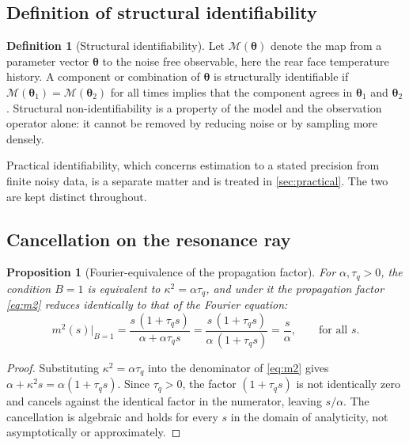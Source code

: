 \documentclass[preprint,12pt,a4paper]{elsarticle}
\theoremstyle{plain}
\newtheorem{proposition}{Proposition}
\theoremstyle{definition}
\newtheorem{definition}{Definition}
\theoremstyle{remark}
\newcommand{\tq}{\tau_{q}}
\newcommand{\kk}{\kappa^{2}}
\newcommand{\Bnum}{B}
\begin{document}
\subsection{Definition of structural identifiability}
\label{sec:struct-defs}

\begin{definition}[Structural identifiability]
\label{def:struct}
Let $\mathcal{M}(\bm{\theta})$ denote the map from a parameter vector
$\bm{\theta}$ to the noise free observable, here the rear face temperature
history. A component or combination of $\bm{\theta}$ is structurally
identifiable if $\mathcal{M}(\bm{\theta}_{1}) = \mathcal{M}(\bm{\theta}_{2})$
for all times implies that the component agrees in $\bm{\theta}_{1}$ and
$\bm{\theta}_{2}$. Structural non-identifiability is a property of the model
and the observation operator alone: it cannot be removed by reducing noise or
by sampling more densely.
\end{definition}

Practical identifiability, which concerns estimation to a stated precision from
finite noisy data, is a separate matter and is treated in
\cref{sec:practical}. The two are kept distinct throughout.

\subsection{Cancellation on the resonance ray}
\label{sec:struct-cancel}

\begin{proposition}[Fourier-equivalence of the propagation factor]
\label{prop:cancel}
For $\alpha, \tq > 0$, the condition $\Bnum = 1$ is equivalent to
$\kk = \alpha\tq$, and under it the propagation factor \eqref{eq:m2} reduces
identically to that of the Fourier equation:
%
\begin{equation}
  m^{2}(s)\big|_{\Bnum=1}
  = \frac{s\,(1+\tq s)}{\alpha + \alpha \tq s}
  = \frac{s\,(1+\tq s)}{\alpha\,(1 + \tq s)}
  = \frac{s}{\alpha} ,
  \qquad \text{for all } s .
  \label{eq:cancel}
\end{equation}
\end{proposition}

\begin{proof}
Substituting $\kk = \alpha\tq$ into the denominator of \eqref{eq:m2} gives
$\alpha + \kk s = \alpha(1 + \tq s)$. Since $\tq > 0$, the factor
$(1 + \tq s)$ is not identically zero and cancels against the identical factor
in the numerator, leaving $s/\alpha$. The cancellation is algebraic and holds
for every $s$ in the domain of analyticity, not asymptotically or
approximately.
\end{proof}
\end{document}
